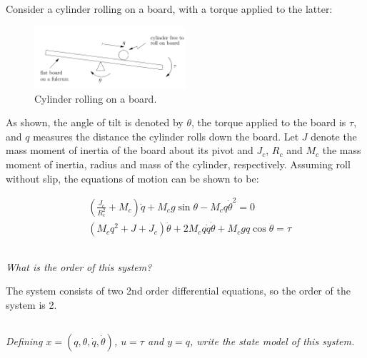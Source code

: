 \section{}
Consider a cylinder rolling on a board, with a torque applied to the latter:
\begin{figure}[h]
    \centering
    \includegraphics[width=0.5\textwidth]{Questions/Figures/Q4ProblemDiagram.png}
    \caption{Cylinder rolling on a board.}
    \label{fig:Q4 System}
\end{figure}


As shown, the angle of tilt is denoted by $\theta$, the torque applied to the board is $\tau$, and $q$ 
measures the distance the cylinder rolls down the board. Let $J$ denote the mass moment of inertia of the board 
about its pivot and $J_c$, $R_c$ and $M_c$ the mass moment of inertia, radius and mass of the cylinder, 
respectively. Assuming roll without slip, the equations of motion can be shown to be:

\begin{align}
    &\left(\frac{J_c}{R_{c}^2} + M_c\right)\ddot{q} + M_{c}g \sin{\theta} - M_{c}q \dot{\theta}^2 = 0 \label{eq: Q4a1} \\
    &(M_{c}q^2 + J + J_c)\ddot{\theta} + 2M_{c}q \dot{q} \dot{\theta} + M_{c}gq \cos{\theta} = \tau \label{eq: Q4a2}
\end{align}

\subsection{}
\textit{What is the order of this system?}

The system consists of two 2nd order differential equations, so the order of the system is 2.
\subsection{}
\textit{Defining $x = (q, \theta, \dot{q}, \dot{\theta})$, $u = \tau$ and $y = q$, write the state model of this system.}

